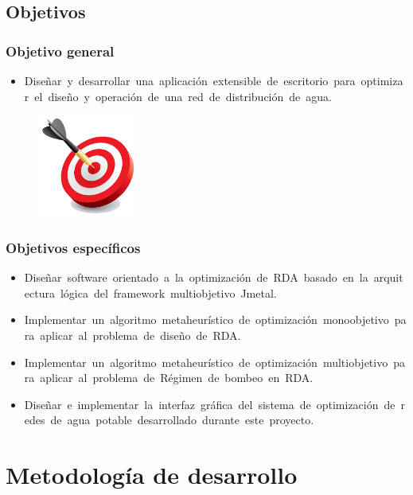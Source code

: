 \documentclass[9pt]{beamer}
\begin{document}
    \subsection{Objetivos}
    \begin{frame}
        \frametitle{Objetivo general}
        
        \begin{itemize}
\justifying
            \item Diseñar y desarrollar una aplicación extensible de escritorio para optimizar el diseño y operación de una red de distribución de agua.
        \end{itemize}

        \begin{figure}
            \includegraphics[width=0.3\textwidth]{assets/Relleno/objetivo.png}
        \end{figure}

    \end{frame}

    \begin{frame}
        \frametitle{Objetivos específicos}
        \begin{itemize}
            \item Diseñar software orientado a la optimización de RDA basado en la arquitectura lógica del framework multiobjetivo Jmetal.
            \item Implementar un algoritmo metaheurístico de optimización monoobjetivo para aplicar al problema de diseño de RDA.
            \item Implementar un algoritmo metaheurístico de optimización multiobjetivo para aplicar al problema de Régimen de bombeo en RDA.
            \item Diseñar e implementar la interfaz gráfica del sistema de optimización de redes de agua potable desarrollado durante este proyecto.
        \end{itemize}
    \end{frame}

    \section{Metodología de desarrollo}
\end{document}
